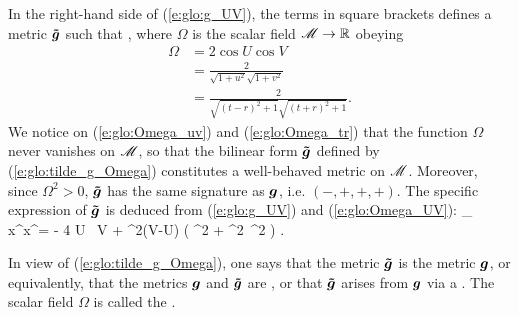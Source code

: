 In the right-hand side of (\ref{e:glo:g_UV}),
the terms in square brackets defines a metric
$\bm{\tilde{g}}$ such that
\be \label{e:glo:tilde_g_Omega}
     ,
\ee
where $\Omega$ is the scalar field $\mathscr{M} \rightarrow \mathbb{R}$ obeying
\begin{subequations}
\begin{align}
    \Omega & =  2 \cos U \cos V \label{e:glo:Omega_UV} \\
           & =  \frac{2}{\sqrt{1+u^2}\sqrt{1+v^2}} \label{e:glo:Omega_uv}\\
           & =  \frac{2}{\sqrt{(t-r)^2+1}\sqrt{(t+r)^2+1}} . \label{e:glo:Omega_tr}
\end{align}
\end{subequations}
We notice on (\ref{e:glo:Omega_uv}) and (\ref{e:glo:Omega_tr}) that the function
$\Omega$ never vanishes on $\mathscr{M}$, so that the bilinear form $\bm{\tilde{g}}$ defined by
(\ref{e:glo:tilde_g_Omega}) constitutes a well-behaved metric on $\mathscr{M}$.
Moreover, since $\Omega^2 > 0$, $\bm{\tilde{g}}$ has the same signature as
$\bm{g}$, i.e. $(-,+,+,+)$.
The specific expression of $\bm{\tilde{g}}$ is deduced from (\ref{e:glo:g_UV})
and (\ref{e:glo:Omega_UV}):
\be \label{e:glo:tg_UV}
    _{\mu\nu} \D x^\mu \D x^\nu =  - 4 \D U \, \D V
        + \sin^2(V-U) \left(  \D\th^2 + \sin^2\th \, \D\ph^2 \right) .
\ee

In view of (\ref{e:glo:tilde_g_Omega}), one says that the metric $\bm{\tilde{g}}$
is  the metric $\bm{g}$, or equivalently,
that the metrics $\bm{g}$ and $\bm{\tilde{g}}$ are
,
or that $\bm{\tilde{g}}$ arises from $\bm{g}$ via a
.
The scalar field $\Omega$ is called the .

